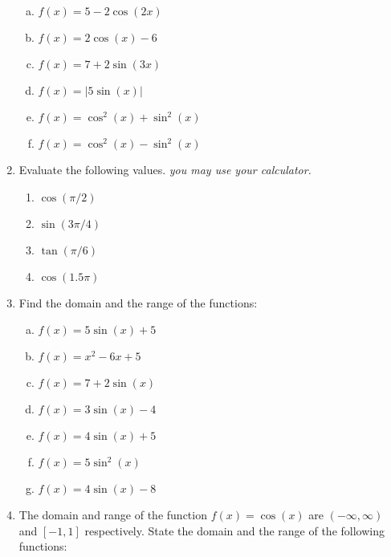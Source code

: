 \documentclass[a4paper,12pt]{article}
\begin{document}
\begin{enumerate}
\begin{multicols}{2}
\begin{enumerate}[(a)]
		\item $f(x) = 5 - 2 \cos(2x)$ 
		\item $f(x) =  2 \cos(x)- 6$ 
		
		\item $f(x) = 7 + 2 \sin(3x)$ 
		
		\item $f(x) = |5\sin(x)|$ 
		
		\item $f(x) = \cos^2(x) +  \sin^2(x)$ 
		\item $f(x) = \cos^2(x) -  \sin^2(x)$ 
	\end{enumerate}	
\end{multicols}		
\item 
Evaluate the following values. \textit{you may use your calculator.}
\begin{multicols}{2}
	\begin{enumerate}
		\item $\cos (\pi/2)$
		\item $\sin (3\pi/4)$
		
		\item $\tan (\pi/6)$
		\item $\cos (1.5 \pi)$
	\end{enumerate} 
\end{multicols}	
\item  Find the domain and the range of the functions:

\begin{multicols}{2}
\begin{enumerate}[(a)]	
\item $\displaystyle{ f(x) = 5 \sin(x)  + 5 }$
\item $\displaystyle{ f(x) = x^2 - 6x + 5  }$
\item $\displaystyle{ f(x) =  7 + 2 \sin(x)}$
\item $\displaystyle{ f(x) = 3 \sin(x)  - 4 }$
\item $\displaystyle{ f(x) = 4 \sin(x)  + 5 }$
\item $\displaystyle{ f(x) = 5 \sin^2(x) }$	
\item $\displaystyle{ f(x) = 4\sin(x)  - 8 }$
\end{enumerate}
\end{multicols}

	\item The domain and range of the function $f(x) = \cos(x)$ are $(-\infty, \infty)$ and $[-1,1]$ respectively. State the domain and the range of the following functions:
	\begin{multicols}{2}
		\begin{itemize}
		

\end{itemize}
\end{multicols}
\end{enumerate}
\end{document}
